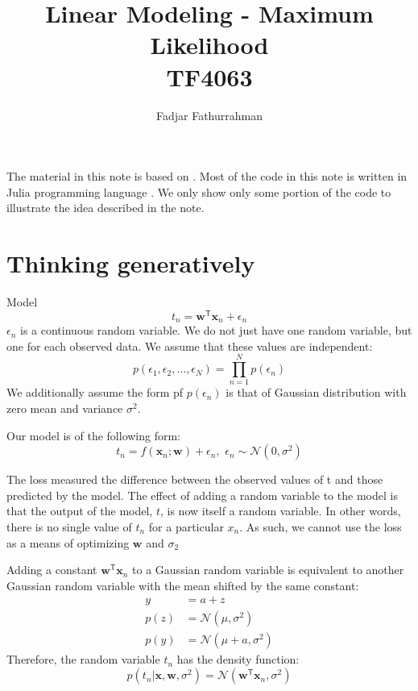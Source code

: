 \documentclass[a4paper,11pt]{article} %
\begin{document}
\title{Linear Modeling - Maximum Likelihood\\
TF4063}
\author{Fadjar Fathurrahman}
\date{}
\maketitle

The material in this note is based on \cite{Rogers2017}.
Most of the code in this note is written in Julia programming language
\cite{Bezanson2017,juliaorg}.
We only show only some portion of the code to illustrate the idea described in the
note.

\section{Thinking generatively}
Model
\begin{equation}
t_{n} = \mathbf{w}^{\mathsf{T}}\mathbf{x}_{n} + \epsilon_{n}
\end{equation}
$\epsilon_{n}$ is a continuous random variable.
We do not just have one random variable, but one for each observed data.
We assume that these values are independent:
\begin{equation}
p(\epsilon_{1},\epsilon_{2},\ldots,\epsilon_{N}) = \prod_{n=1}^{N} p(\epsilon_{n})
\end{equation}
We additionally assume the form pf $p(\epsilon_{n})$ is that of Gaussian
distribution with zero mean and variance $\sigma^2$.

Our model is of the following form:
\begin{equation}
t_{n} = f(\mathbf{x}_{n}; \mathbf{w}) + \epsilon_{n}, \,\, \epsilon_{n} \sim \mathcal{N}(0,\sigma^2)
\end{equation}

The loss measured the difference between the observed
values of t and those predicted by the model. The effect of adding a random variable
to the model is that the output of the model, $t$, is now itself a random variable. In
other words, there is no single value of $t_n$ for a particular $x_n$.
As such, we cannot use the loss as a means of optimizing $\mathbf{w}$
and $\sigma_{2}$

Adding a constant $\mathbf{w}^{\mathsf{T}}\mathbf{x}_{n}$ to a
Gaussian random variable is equivalent to another Gaussian random variable
with the mean shifted by the same constant:
\begin{align*}
y & = a + z \\
p(z) & = \mathcal{N}(\mu,\sigma^2) \\
p(y) & = \mathcal{N}(\mu + a,\sigma^2)
\end{align*}
Therefore, the random variable $t_n$ has the density function:
\begin{equation}
p(t_{n}|\mathbf{x},\mathbf{w},\sigma^2) =
\mathcal{N}(\mathbf{w}^{\mathsf{T}}\mathbf{x}_{n},\sigma^2)
\end{equation}
\end{document}
